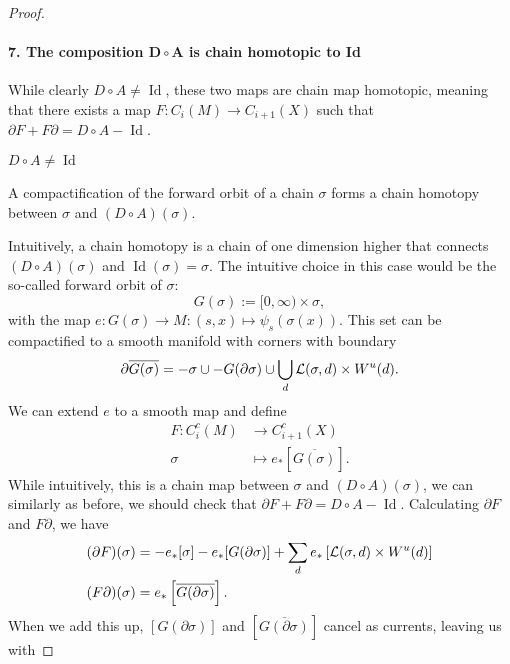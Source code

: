 \begin{proof}
\paragraph{7. The composition $\bm{D  \circ A}$ is chain homotopic to Id}
While clearly $D  \circ  A \neq \operatorname{Id}$, these two maps are chain map homotopic, meaning that there exists a map $F: C_i(M) \to  C_{i+1}(X)$ such that $\partial F + F \partial = D  \circ  A - \operatorname{Id}$.
\begin{marginfigure}
    \centering
    \caption{$D  \circ  A \neq  \operatorname{Id}$}
    \label{fig:d-na-a-is-not-identity}
\end{marginfigure}
\begin{marginfigure}
    \centering
    \caption{A compactification of the forward orbit of a chain $\sigma$ forms a chain homotopy between $\sigma$ and  $(D  \circ  A)(\sigma)$.}
    \label{fig:chain-homotopy-between-d-na-a-and-id}
\end{marginfigure}
Intuitively, a chain homotopy is a chain of one dimension higher that connects $(D  \circ  A)(\sigma)$ and $\operatorname{Id} (\sigma) = \sigma$.
The intuitive choice in this case would be the so-called forward orbit of $\sigma$:
\[
    G(\sigma) := [0, \infty) \times \sigma
,\] with the map $e: G(\sigma) \to  M: (s, x) \mapsto \psi_s (\sigma(x))$.
This set can be compactified to a smooth manifold with corners with boundary
\[
    \partial \overline{G(\sigma)} = - \sigma \cup - G(\partial \sigma) \cup \bigcup_{d}  \mathcal L(\sigma, d) \times W^u(d)
.\] 
We can extend $e$ to a smooth map and define 
\begin{align*}
    F: C_i^{c}(M) &\longrightarrow C_{i+1}^{c}(X) \\
    \sigma &\longmapsto e_* \left[ \overline{G(\sigma)} \right] 
.\end{align*}
While intuitively, this is a chain map between $\sigma$ and  $(D  \circ A)(\sigma)$, we can similarly as before, we should check that $\partial F + F \partial = D  \circ  A - \operatorname{Id}$.
Calculating $\partial F$ and  $F \partial$, we have
\begin{align*}
    (\partial F)(\sigma) &= -e_*[\sigma] - e_*[G(\partial \sigma)] + \sum_{d} e_*\left[\mathcal L(\sigma, d) \times W^u(d)\right]\\
    (F \partial)(\sigma) &= e_*\left[\overline{G(\partial \sigma)}\right]
    .\end{align*}
    When we add this up, $[G (\partial \sigma)]$ and $\left[ \overline{G(\partial \sigma)} \right]$ cancel as currents, leaving us with


\end{proof}
